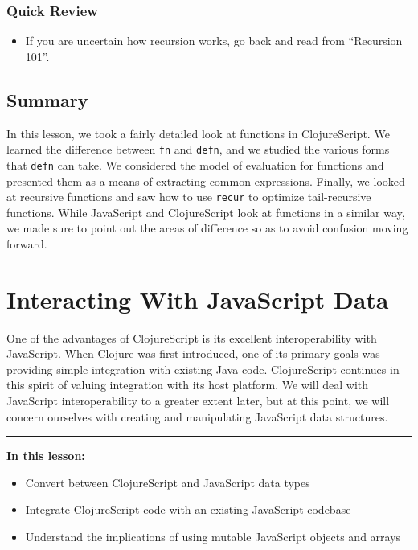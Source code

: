 \documentclass[10pt,twoside,openright]{memoir}
\begin{document}
\subsection{Quick Review}

\begin{itemize}
\tightlist
\item
  If you are uncertain how recursion works, go back and read from
  ``Recursion 101''.
\end{itemize}


\section{Summary}

In this lesson, we took a fairly detailed look at functions in
ClojureScript. We learned the difference between \texttt{fn} and
\texttt{defn}, and we studied the various forms that \texttt{defn} can
take. We considered the model of evaluation for functions and presented
them as a means of extracting common expressions. Finally, we looked at
recursive functions and saw how to use \texttt{recur} to optimize
tail-recursive functions. While JavaScript and ClojureScript look at
functions in a similar way, we made sure to point out the areas of
difference so as to avoid confusion moving forward.

\chapter{Interacting With JavaScript Data}

One of the advantages of ClojureScript is its excellent interoperability
with JavaScript. When Clojure was first introduced, one of its primary
goals was providing simple integration with existing Java code.
ClojureScript continues in this spirit of valuing integration with its
host platform. We will deal with JavaScript interoperability to a
greater extent later, but at this point, we will concern ourselves with
creating and manipulating JavaScript data structures.

\begin{center}\rule{0.5\linewidth}{0.5pt}\end{center}

\textbf{In this lesson:}

\begin{itemize}
\tightlist
\item
  Convert between ClojureScript and JavaScript data types
\item
  Integrate ClojureScript code with an existing JavaScript codebase
\item
  Understand the implications of using mutable JavaScript objects and
  arrays
\end{itemize}
\end{document}
